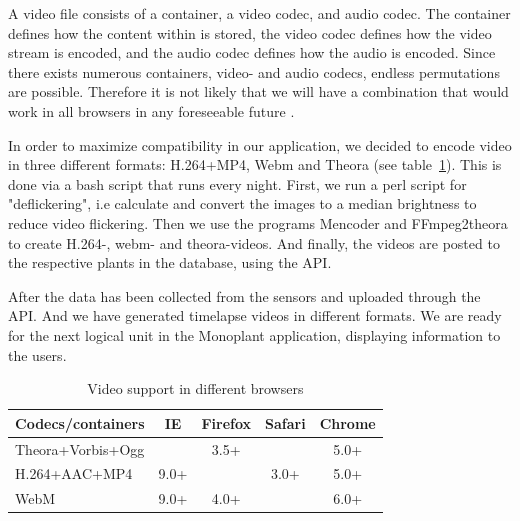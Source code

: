 A video file consists of a container, a video codec, and audio codec. The container defines how the content within is stored, the video codec defines how the video stream is encoded, and the audio codec defines how the audio is encoded. Since there exists numerous containers, video- and audio codecs, endless permutations are possible. Therefore it is not likely that we will have a combination that would work in all browsers in any foreseeable future \citep{pilgrim2010html5}.

In order to maximize compatibility in our application, we decided to encode video in three different formats: H.264+MP4, Webm and Theora (see table~\ref{tab:videosupport}). This is done via a bash script that runs every night. First, we run a perl script for "deflickering", i.e calculate and convert the images to a median brightness to reduce video flickering. Then we use the programs Mencoder and FFmpeg2theora to create H.264-, webm- and theora-videos. And finally, the videos are posted to the respective plants in the database, using the API. 

After the data has been collected from the sensors and uploaded through the API. And we have generated timelapse videos in different formats. We are ready for the next logical unit in the Monoplant application, displaying information to the users. 

\begin{table}\centering
\begin{tabular}{@{}lcccc@{}} \toprule
Codecs/containers & IE & Firefox & Safari & Chrome \\ \midrule
Theora+Vorbis+Ogg & ~                 & 3.5+    & ~      & 5.0+   \\ 
H.264+AAC+MP4     & 9.0+              & ~       & 3.0+   & 5.0+   \\ 
WebM              & 9.0+              & 4.0+    & ~      & 6.0+   \\ \bottomrule
\end{tabular}
\caption{Video support in different browsers \citep{pilgrim2010html5}}
\label{tab:videosupport}
\end{table}




